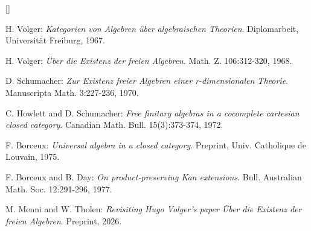 \documentclass[11pt,a4paper]{article}
\begin{document}
\begin{list}{[]}{%
  \setlength{\leftmargin}{1.8em}%
  \setlength{\labelwidth}{1.4em}%
  \setlength{\labelsep}{.4em}%
  \setlength{\itemsep}{.4em}%
  \setlength{\parsep}{0pt}%
  \setlength{\topsep}{.3em}%
}
\small
\item H. Volger: \emph{Kategorien von Algebren \"uber algebraischen Theorien}. Diplomarbeit, Universit\"at Freiburg, 1967.
\item H. Volger: \emph{\"Uber die Existenz der freien Algebren}. Math. Z. 106:312-320, 1968.
\item D. Schumacher: \emph{Zur Existenz freier Algebren einer r-dimensionalen Theorie}. Manuscripta Math. 3:227-236, 1970.
\item C. Howlett and D. Schumacher: \emph{Free finitary algebras in a cocomplete cartesian closed category}. Canadian Math. Bull. 15(3):373-374, 1972.
\item F. Borceux: \emph{Universal algebra in a closed category}. Preprint, Univ. Catholique de Louvain, 1975.
\item F. Borceux and B. Day: \emph{On product-preserving Kan extensions}. Bull. Australian Math. Soc. 12:291-296, 1977.
\item M. Menni and W. Tholen: \emph{Revisiting Hugo Volger's paper \"Uber die Existenz der freien Algebren}. Preprint, 2026.
\end{list}
\end{document}
